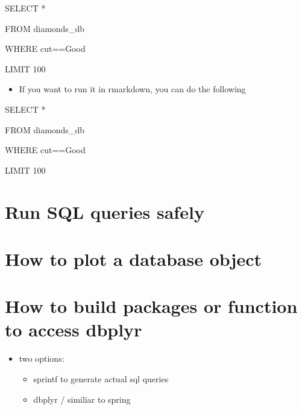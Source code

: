 \documentclass[
  letterpaper,
  DIV=11,
  numbers=noendperiod]{scrreprt}
\newenvironment{Shaded}{\begin{snugshade}}{\end{snugshade}}
\newcommand{\DecValTok}[1]{\textcolor[rgb]{0.68,0.00,0.00}{#1}}
\newcommand{\KeywordTok}[1]{\textcolor[rgb]{0.00,0.23,0.31}{#1}}
\newcommand{\NormalTok}[1]{\textcolor[rgb]{0.00,0.23,0.31}{#1}}
\newcommand{\OperatorTok}[1]{\textcolor[rgb]{0.37,0.37,0.37}{#1}}
\newcommand{\StringTok}[1]{\textcolor[rgb]{0.13,0.47,0.30}{#1}}
\providecommand{\tightlist}{%
  \setlength{\itemsep}{0pt}\setlength{\parskip}{0pt}}\usepackage{longtable,booktabs,array}
\begin{document}
\begin{Shaded}
\begin{Highlighting}[]
\KeywordTok{SELECT} \OperatorTok{*} 

\KeywordTok{FROM}\NormalTok{ diamonds\_db}

\KeywordTok{WHERE}\NormalTok{ cut}\OperatorTok{==}\StringTok{\textquotesingle{}Good\textquotesingle{}}

\KeywordTok{LIMIT} \DecValTok{100}
\end{Highlighting}
\end{Shaded}

\begin{itemize}
\tightlist
\item
  If you want to run it in rmarkdown, you can do the following
\end{itemize}

\begin{Shaded}
\begin{Highlighting}[]

\KeywordTok{SELECT} \OperatorTok{*} 

\KeywordTok{FROM}\NormalTok{ diamonds\_db}

\KeywordTok{WHERE}\NormalTok{ cut}\OperatorTok{==}\StringTok{\textquotesingle{}Good\textquotesingle{}}

\KeywordTok{LIMIT} \DecValTok{100}
\end{Highlighting}
\end{Shaded}

\section{Run SQL queries safely}\label{run-sql-queries-safely}

\section{How to plot a database
object}\label{how-to-plot-a-database-object}

\section{How to build packages or function to access
dbplyr}\label{how-to-build-packages-or-function-to-access-dbplyr}

\begin{itemize}
\item
  two options:

  \begin{itemize}
  \tightlist
  \item
    sprintf to generate actual sql queries
  \item
    dbplyr / similiar to spring
  \end{itemize}
\end{itemize}
\end{document}
